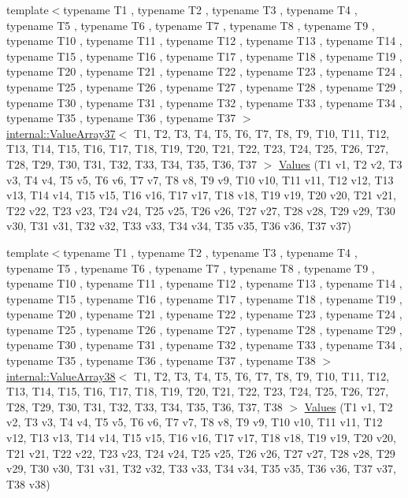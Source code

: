 \begin{DoxyCompactItemize}
{\footnotesize template$<$typename T1 , typename T2 , typename T3 , typename T4 , typename T5 , typename T6 , typename T7 , typename T8 , typename T9 , typename T10 , typename T11 , typename T12 , typename T13 , typename T14 , typename T15 , typename T16 , typename T17 , typename T18 , typename T19 , typename T20 , typename T21 , typename T22 , typename T23 , typename T24 , typename T25 , typename T26 , typename T27 , typename T28 , typename T29 , typename T30 , typename T31 , typename T32 , typename T33 , typename T34 , typename T35 , typename T36 , typename T37 $>$ }\\\mbox{\hyperlink{classtesting_1_1internal_1_1ValueArray37}{internal\+::\+Value\+Array37}}$<$ T1, T2, T3, T4, T5, T6, T7, T8, T9, T10, T11, T12, T13, T14, T15, T16, T17, T18, T19, T20, T21, T22, T23, T24, T25, T26, T27, T28, T29, T30, T31, T32, T33, T34, T35, T36, T37 $>$ \mbox{\hyperlink{namespacetesting_aa800bbbe42a44b1776cfd61c9e337ab6}{Values}} (T1 v1, T2 v2, T3 v3, T4 v4, T5 v5, T6 v6, T7 v7, T8 v8, T9 v9, T10 v10, T11 v11, T12 v12, T13 v13, T14 v14, T15 v15, T16 v16, T17 v17, T18 v18, T19 v19, T20 v20, T21 v21, T22 v22, T23 v23, T24 v24, T25 v25, T26 v26, T27 v27, T28 v28, T29 v29, T30 v30, T31 v31, T32 v32, T33 v33, T34 v34, T35 v35, T36 v36, T37 v37)
\item 
{\footnotesize template$<$typename T1 , typename T2 , typename T3 , typename T4 , typename T5 , typename T6 , typename T7 , typename T8 , typename T9 , typename T10 , typename T11 , typename T12 , typename T13 , typename T14 , typename T15 , typename T16 , typename T17 , typename T18 , typename T19 , typename T20 , typename T21 , typename T22 , typename T23 , typename T24 , typename T25 , typename T26 , typename T27 , typename T28 , typename T29 , typename T30 , typename T31 , typename T32 , typename T33 , typename T34 , typename T35 , typename T36 , typename T37 , typename T38 $>$ }\\\mbox{\hyperlink{classtesting_1_1internal_1_1ValueArray38}{internal\+::\+Value\+Array38}}$<$ T1, T2, T3, T4, T5, T6, T7, T8, T9, T10, T11, T12, T13, T14, T15, T16, T17, T18, T19, T20, T21, T22, T23, T24, T25, T26, T27, T28, T29, T30, T31, T32, T33, T34, T35, T36, T37, T38 $>$ \mbox{\hyperlink{namespacetesting_aabc33ee31d17eb0b0bed3401d62266d9}{Values}} (T1 v1, T2 v2, T3 v3, T4 v4, T5 v5, T6 v6, T7 v7, T8 v8, T9 v9, T10 v10, T11 v11, T12 v12, T13 v13, T14 v14, T15 v15, T16 v16, T17 v17, T18 v18, T19 v19, T20 v20, T21 v21, T22 v22, T23 v23, T24 v24, T25 v25, T26 v26, T27 v27, T28 v28, T29 v29, T30 v30, T31 v31, T32 v32, T33 v33, T34 v34, T35 v35, T36 v36, T37 v37, T38 v38)

\end{DoxyCompactItemize}
